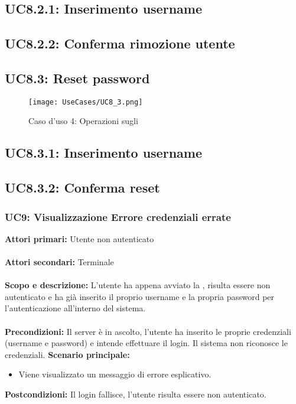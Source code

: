 \documentclass{scalatekids-article}
\begin{document}
\subsection{UC8.2.1: Inserimento username}

\subsection{UC8.2.2: Conferma rimozione utente}

\subsection{UC8.3: Reset password}

\begin{figure}[H]
  \begin{center}
    \texttt{[image: UseCases/UC8\_3.png]}
    \caption*{Caso d'uso 4: Operazioni sugli }
  \end{center}
\end{figure}

\subsection{UC8.3.1: Inserimento username}

\subsection{UC8.3.2: Conferma reset}

\subsubsection{UC9: Visualizzazione Errore credenziali errate}

\textbf{Attori primari:} Utente non autenticato\\ \\
\textbf{Attori secondari:} Terminale\\ \\
\textbf{Scopo e descrizione:}
L'utente ha appena avviato la , risulta essere non autenticato e ha già inserito il proprio username e la propria password per l'autenticazione all'interno del sistema.\\ \\
\textbf{Precondizioni:} Il server è in ascolto, l'utente ha inserito le proprie credenziali (username e password) e intende effettuare il login. Il sistema non riconosce le credenziali.
\textbf{Scenario principale:}
\begin{itemize}
\item Viene visualizzato un messaggio di errore esplicativo.
\end{itemize}
\textbf{Postcondizioni:} Il login fallisce, l'utente risulta essere non autenticato.
\end{document}

